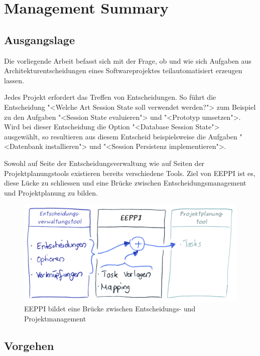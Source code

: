 \chapter*{Management Summary}
	
	
	\section*{Ausgangslage}
	
	Die vorliegende Arbeit befasst sich mit der Frage,
	ob und wie sich Aufgaben aus Architekturentscheidungen eines Softwareprojektes teilautomatisiert erzeugen lassen.
	
	Jedes Projekt erfordert das Treffen von Entscheidungen.
	So führt die Entscheidung "<Welche Art Session State soll verwendet werden?"> zum Beispiel zu den Aufgaben
	"<Session State evaluieren"> und "<Prototyp umsetzen">.
	Wird bei dieser Entscheidung die Option "<Database Session State"> ausgewählt,
	so resultieren aus diesem Entscheid beispielsweise die Aufgaben "<Datenbank installieren"> und
		"<Session Persistenz implementieren">.
	
	Sowohl auf Seite der Entscheidungsverwaltung wie auf Seiten der Projektplanungstools existieren bereits verschiedene Tools.
	Ziel von EEPPI ist es, diese Lücke zu schliessen und eine Brücke zwischen Entscheidungsmanagement und Projektplanung zu bilden.
	
	\begin{figure}[H]
		\includegraphics[width=\textwidth]{introduction/img/eeppiVision.png}
		\centering
		\caption{EEPPI bildet eine Brücke zwischen Entscheidungs- und Projektmanagement}
		\label{fig:eeppiBridgeBetweenDecisionsAndTasks}
	\end{figure}
	
	
	\section*{Vorgehen}
	
